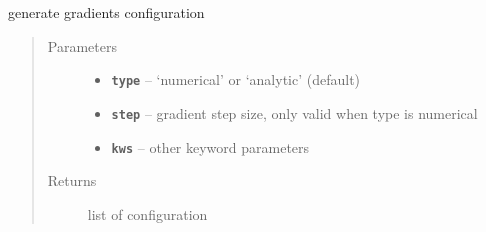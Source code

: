 \documentclass[letterpaper,10pt,english]{sphinxmanual}
\begin{document}
\begin{fulllineitems}

\begin{fulllineitems}
\label{src/apidocs/genopt:genopt.DakotaResponses.gradients}
generate gradients configuration
\begin{quote}\begin{description}
\item[{Parameters}] \leavevmode\begin{itemize}
\item {} 
\textbf{\texttt{type}} -- `numerical' or `analytic' (default)

\item {} 
\textbf{\texttt{step}} -- gradient step size, only valid when type is numerical

\item {} 
\textbf{\texttt{kws}} -- other keyword parameters

\end{itemize}

\item[{Returns}] \leavevmode
list of configuration

\end{description}\end{quote}

\end{fulllineitems}


\end{fulllineitems}

\end{document}
